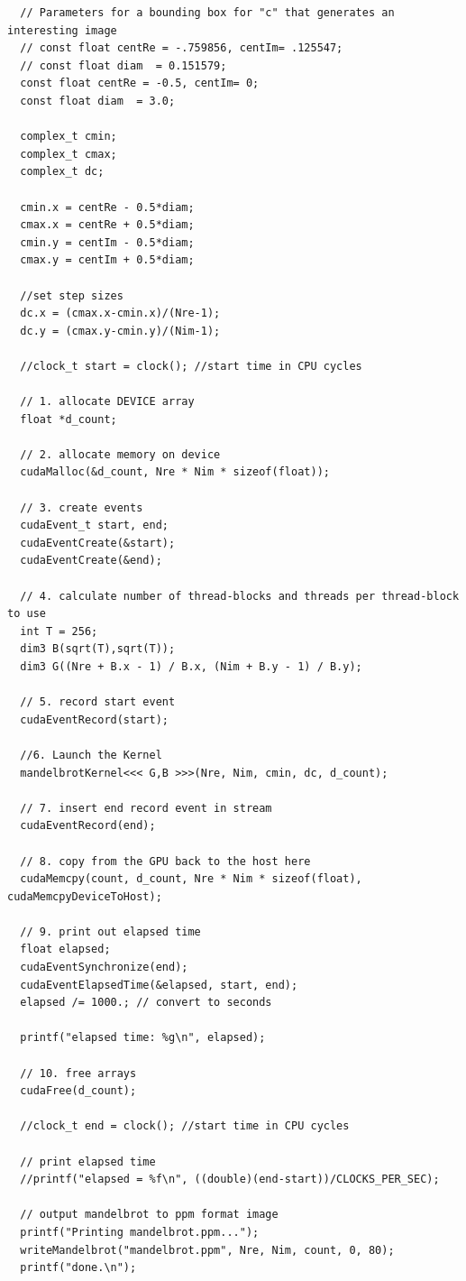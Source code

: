 \documentclass{article}
\begin{document}
\begin{verbatim}
  // Parameters for a bounding box for "c" that generates an interesting image
  // const float centRe = -.759856, centIm= .125547;
  // const float diam  = 0.151579;
  const float centRe = -0.5, centIm= 0;
  const float diam  = 3.0;

  complex_t cmin;
  complex_t cmax;
  complex_t dc;

  cmin.x = centRe - 0.5*diam;
  cmax.x = centRe + 0.5*diam;
  cmin.y = centIm - 0.5*diam;
  cmax.y = centIm + 0.5*diam;

  //set step sizes
  dc.x = (cmax.x-cmin.x)/(Nre-1);
  dc.y = (cmax.y-cmin.y)/(Nim-1);

  //clock_t start = clock(); //start time in CPU cycles

  // 1. allocate DEVICE array
  float *d_count;

  // 2. allocate memory on device
  cudaMalloc(&d_count, Nre * Nim * sizeof(float));

  // 3. create events
  cudaEvent_t start, end;
  cudaEventCreate(&start);
  cudaEventCreate(&end);

  // 4. calculate number of thread-blocks and threads per thread-block to use
  int T = 256;
  dim3 B(sqrt(T),sqrt(T));
  dim3 G((Nre + B.x - 1) / B.x, (Nim + B.y - 1) / B.y);

  // 5. record start event
  cudaEventRecord(start);

  //6. Launch the Kernel
  mandelbrotKernel<<< G,B >>>(Nre, Nim, cmin, dc, d_count);

  // 7. insert end record event in stream
  cudaEventRecord(end);

  // 8. copy from the GPU back to the host here
  cudaMemcpy(count, d_count, Nre * Nim * sizeof(float), cudaMemcpyDeviceToHost);

  // 9. print out elapsed time
  float elapsed;
  cudaEventSynchronize(end);
  cudaEventElapsedTime(&elapsed, start, end);
  elapsed /= 1000.; // convert to seconds

  printf("elapsed time: %g\n", elapsed);

  // 10. free arrays
  cudaFree(d_count);

  //clock_t end = clock(); //start time in CPU cycles

  // print elapsed time
  //printf("elapsed = %f\n", ((double)(end-start))/CLOCKS_PER_SEC);

  // output mandelbrot to ppm format image
  printf("Printing mandelbrot.ppm...");
  writeMandelbrot("mandelbrot.ppm", Nre, Nim, count, 0, 80);
  printf("done.\n");


\end{verbatim}
\end{document}
